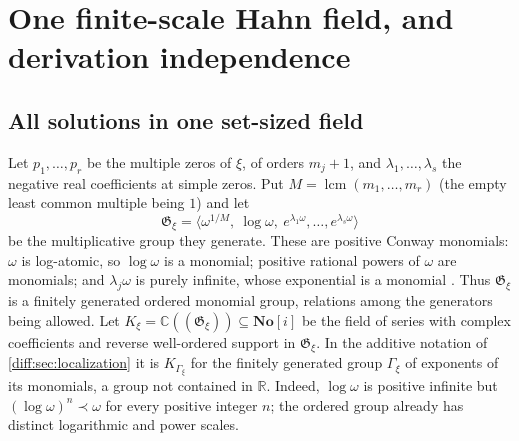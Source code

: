 \documentclass[11pt,letterpaper]{article}
\numberwithin{equation}{section}
\theoremstyle{definition}
\theoremstyle{remark}
\newcommand{\SC}{\mathbf{No}[i]}
\newcommand{\R}{\mathbb R}
\newcommand{\C}{\mathbb C}
\begin{document}
\section{One finite-scale Hahn field, and derivation independence}
\label{diff:aut:sec:scales}

\subsection{All solutions in one set-sized field}
\label{diff:aut:sub:scales}

Let $p_{1},\dots,p_{r}$ be the multiple zeros of $\xi$, of orders $m_{j}+1$, and
$\lambda_{1},\dots,\lambda_{s}$ the negative real coefficients at simple zeros.
Put $M=\operatorname{lcm}(m_{1},\dots,m_{r})$ (the empty least common multiple being
$1$) and let
\begin{equation}\label{diff:aut:eq:group}
 \mathfrak G_{\xi}=\bigl\langle\omega^{1/M},\ \log\omega,\
 e^{\lambda_{1}\omega},\dots,e^{\lambda_{s}\omega}\bigr\rangle
\end{equation}
be the multiplicative group they generate. These are positive Conway
monomials: $\omega$ is log-atomic, so $\log\omega$ is a monomial;
positive rational powers of $\omega$ are monomials; and
$\lambda_j\omega$ is purely infinite, whose exponential is a monomial
\cite[\S3.2, Definition~5.1 and Remark~5.18]{BM}. Thus $\mathfrak G_{\xi}$ is a finitely
generated ordered monomial group, relations among the generators being allowed.
Let $K_{\xi}=\C((\mathfrak G_{\xi}))\subseteq\SC$ be the field of series with
complex coefficients and reverse well-ordered support in $\mathfrak G_{\xi}$. In
the additive notation of \cref{diff:sec:localization} it is $K_{\Gamma_{\xi}}$ for
the finitely generated group $\Gamma_{\xi}$ of exponents of its monomials, a group
not contained in $\R$. Indeed, $\log\omega$ is positive infinite but
$(\log\omega)^n\prec\omega$ for every positive integer $n$; the
ordered group already has distinct logarithmic and power scales.
\end{document}
